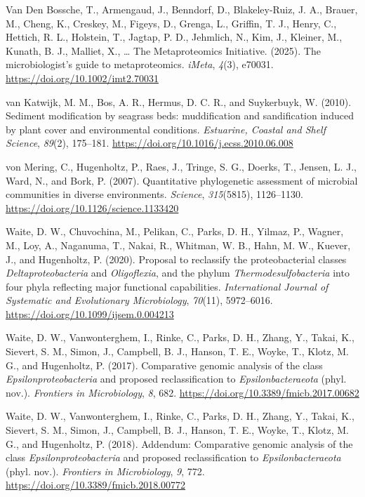 \documentclass[
  12 pt,
]{book}
\newlength{\cslhangindent}
\newlength{\cslentryspacingunit} %
\newenvironment{CSLReferences}[2] %
 {%
  \setlength{\parindent}{0pt}
  \ifodd #1
  \let\oldpar\par
  \def\par{\hangindent=\cslhangindent\oldpar}
  \fi
  \setlength{\parskip}{#2\cslentryspacingunit}
 }%
 {}
\begin{document}
\begin{CSLReferences}{1}{0}
\leavevmode{}%
Van Den Bossche, T., Armengaud, J., Benndorf, D., Blakeley-Ruiz, J. A., Brauer, M., Cheng, K., Creskey, M., Figeys, D., Grenga, L., Griffin, T. J., Henry, C., Hettich, R. L., Holstein, T., Jagtap, P. D., Jehmlich, N., Kim, J., Kleiner, M., Kunath, B. J., Malliet, X., \ldots{} The Metaproteomics Initiative. (2025). The microbiologist's guide to metaproteomics. \emph{iMeta}, \emph{4}(3), e70031. \url{https://doi.org/10.1002/imt2.70031}

\leavevmode{}%
van Katwijk, M. M., Bos, A. R., Hermus, D. C. R., and Suykerbuyk, W. (2010). Sediment modification by seagrass beds: muddification and sandification induced by plant cover and environmental conditions. \emph{Estuarine, Coastal and Shelf Science}, \emph{89}(2), 175--181. \url{https://doi.org/10.1016/j.ecss.2010.06.008}

\leavevmode{}%
von Mering, C., Hugenholtz, P., Raes, J., Tringe, S. G., Doerks, T., Jensen, L. J., Ward, N., and Bork, P. (2007). Quantitative phylogenetic assessment of microbial communities in diverse environments. \emph{Science}, \emph{315}(5815), 1126--1130. \url{https://doi.org/10.1126/science.1133420}

\leavevmode{}%
Waite, D. W., Chuvochina, M., Pelikan, C., Parks, D. H., Yilmaz, P., Wagner, M., Loy, A., Naganuma, T., Nakai, R., Whitman, W. B., Hahn, M. W., Kuever, J., and Hugenholtz, P. (2020). Proposal to reclassify the proteobacterial classes {{\emph{Deltaproteobacteria}}} and {{\emph{Oligoflexia}}}, and the phylum {{\emph{Thermodesulfobacteria}}} into four phyla reflecting major functional capabilities. \emph{International Journal of Systematic and Evolutionary Microbiology}, \emph{70}(11), 5972--6016. \url{https://doi.org/10.1099/ijsem.0.004213}

\leavevmode{}%
Waite, D. W., Vanwonterghem, I., Rinke, C., Parks, D. H., Zhang, Y., Takai, K., Sievert, S. M., Simon, J., Campbell, B. J., Hanson, T. E., Woyke, T., Klotz, M. G., and Hugenholtz, P. (2017). Comparative genomic analysis of the class {{\emph{Epsilonproteobacteria}}} and proposed reclassification to {{\emph{Epsilonbacteraeota}}} (phyl. nov.). \emph{Frontiers in Microbiology}, \emph{8}, 682. \url{https://doi.org/10.3389/fmicb.2017.00682}

\leavevmode{}%
Waite, D. W., Vanwonterghem, I., Rinke, C., Parks, D. H., Zhang, Y., Takai, K., Sievert, S. M., Simon, J., Campbell, B. J., Hanson, T. E., Woyke, T., Klotz, M. G., and Hugenholtz, P. (2018). Addendum: {Comparative} genomic analysis of the class {{\emph{Epsilonproteobacteria}}} and proposed reclassification to {{\emph{Epsilonbacteraeota}}} (phyl. nov.). \emph{Frontiers in Microbiology}, \emph{9}, 772. \url{https://doi.org/10.3389/fmicb.2018.00772}


\end{CSLReferences}
\end{document}
